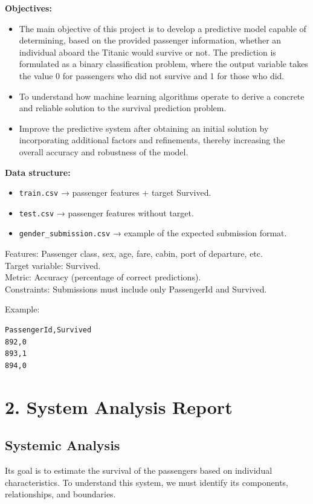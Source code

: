 \documentclass[12pt]{report}
\begin{document}
\textbf{Objectives:}
\begin{itemize}
    \item The main objective of this project is to develop a predictive model capable of determining, based on the provided passenger information, whether an individual aboard the Titanic would survive or not. The prediction is formulated as a binary classification problem, where the output variable takes the value 0 for passengers who did not survive and 1 for those who did.
    \item To understand how machine learning algorithms operate to derive a concrete and reliable solution to the survival prediction problem.
    \item Improve the predictive system after obtaining an initial solution by incorporating additional factors and refinements, thereby increasing the overall accuracy and robustness of the model.
\end{itemize}

\textbf{Data structure:}
\begin{itemize}
    \item \texttt{train.csv} → passenger features + target Survived.
    \item \texttt{test.csv} → passenger features without target.
    \item \texttt{gender\_submission.csv} → example of the expected submission format.
\end{itemize}

Features: Passenger class, sex, age, fare, cabin, port of departure, etc. \\
Target variable: Survived. \\
Metric: Accuracy (percentage of correct predictions). \\
Constraints: Submissions must include only PassengerId and Survived. 

Example:
\begin{verbatim}
PassengerId,Survived
892,0
893,1
894,0
\end{verbatim}

\section*{2. System Analysis Report}

\subsection*{Systemic Analysis}
Its goal is to estimate the survival of the passengers based on individual characteristics. To understand this system, we must identify its components, relationships, and boundaries.
\end{document}

